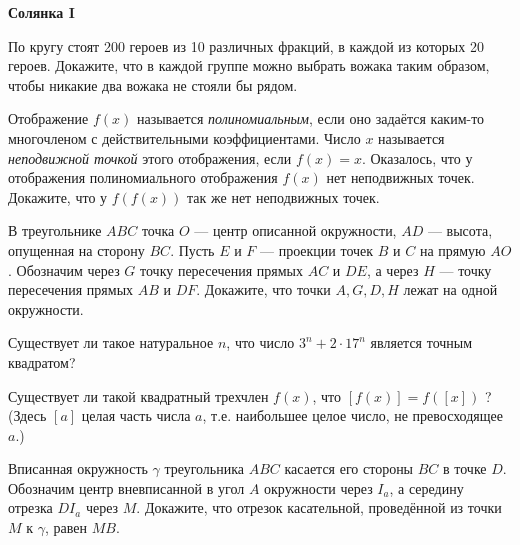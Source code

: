 \centerline{\bf \Huge Солянка I}
\centerline{\bf \Huge }

\begin{flushright}
        \scriptsize{}
\end{flushright}

По кругу стоят 200 героев из 10 различных фракций, в каждой из которых 20 героев. Докажите, что в каждой группе можно выбрать вожака таким образом, чтобы никакие два вожака не стояли бы рядом.

Отображение $f(x)$ называется \textit{полиномиальным}, если оно задаётся каким-то многочленом с действительными коэффициентами. Число $x$ называется \textit{неподвижной точкой} этого отображения, если $f(x) = x$. Оказалось, что у отображения полиномиального отображения $f(x)$ нет неподвижных точек. Докажите, что у $f(f(x))$ так же нет неподвижных точек.

В треугольнике $A B C$ точка $O$ --- центр описанной окружности, $A D$ --- высота, опущенная на сторону $B C$. Пусть $E$ и $F$ --- проекции точек $B$ и $C$ на прямую $A O$. Обозначим через $G$ точку пересечения прямых $A C$ и $D E$, а через $H$ --- точку пересечения прямых $A B$ и $D F$. Докажите, что точки $A, G, D, H$ лежат на одной окружности.

Существует ли такое натуральное $n$, что число $3^n+2 \cdot 17^n$ является точным квадратом?

Существует ли такой квадратный трехчлен $f(x)$, что $[f(x)]=f([x])$ ? (Здесь $[a]$ целая часть числа $a$, т.е. наибольшее целое число, не превосходящее $a$.)

Вписанная окружность $\gamma$ треугольника $A B C$ касается его стороны $B C$ в точке $D$. Обозначим центр вневписанной в угол $A$ окружности через $I_a$, а середину отрезка $D I_a$ через $M$. Докажите, что отрезок касательной, проведённой из точки $M$ к $\gamma$, равен $M B$.